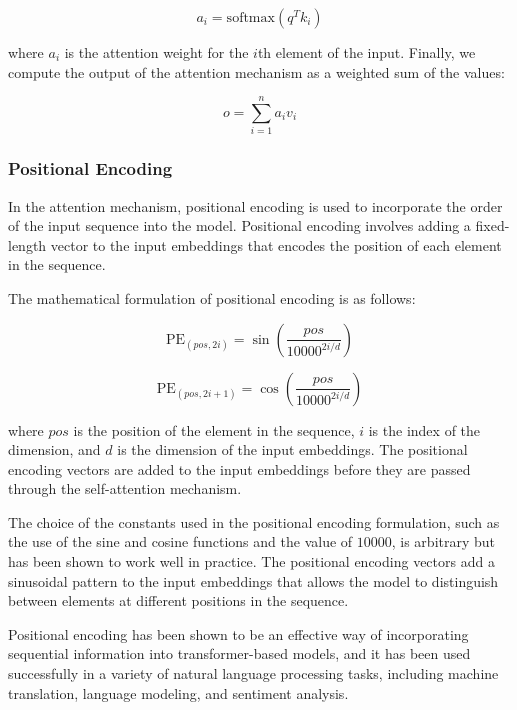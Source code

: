 \begin{equation}
	a_i = \text{softmax}(q^T k_i)
\end{equation}

where $a_i$ is the attention weight for the $i$th element of the input. Finally, we compute the output of the attention mechanism as a weighted sum of the values:

\begin{equation}
	o = \sum_{i=1}^{n} a_i v_i
\end{equation}

\subsubsection{Positional Encoding}
\label{subsubsec:3_positional_encoding}

In the attention mechanism, positional encoding is used to incorporate the order of the input sequence into the model. Positional encoding involves adding a fixed-length vector to the input embeddings that encodes the position of each element in the sequence.

The mathematical formulation of positional encoding is as follows:

\begin{equation}
	\text{PE}_{(pos,2i)} = \sin\left(\frac{pos}{10000^{2i/d}}\right)
\end{equation}

\begin{equation}
	\text{PE}_{(pos,2i+1)} = \cos\left(\frac{pos}{10000^{2i/d}}\right)
\end{equation}

where $pos$ is the position of the element in the sequence, $i$ is the index of the dimension, and $d$ is the dimension of the input embeddings. The positional encoding vectors are added to the input embeddings before they are passed through the self-attention mechanism.

The choice of the constants used in the positional encoding formulation, such as the use of the sine and cosine functions and the value of $10000$, is arbitrary but has been shown to work well in practice. The positional encoding vectors add a sinusoidal pattern to the input embeddings that allows the model to distinguish between elements at different positions in the sequence.

Positional encoding has been shown to be an effective way of incorporating sequential information into transformer-based models, and it has been used successfully in a variety of natural language processing tasks, including machine translation, language modeling, and sentiment analysis.

